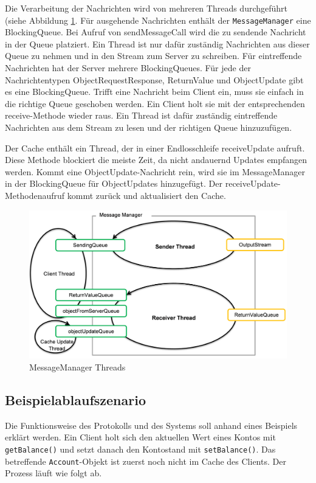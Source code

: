 Die Verarbeitung der Nachrichten wird von mehreren Threads durch\-ge\-führt (siehe Abbildung \ref{fig:msgmng}.
Für ausgehende Nachrichten enthält der \-\texttt{Mes\-sage\-Manager} eine BlockingQueue. Bei Aufruf von sendMessageCall wird die zu sendende Nachricht in der Queue platziert. Ein Thread ist nur dafür zu\-ständig Nachrichten aus dieser Queue zu nehmen und in den Stream zum Server zu schreiben.
Für eintreffende Nachrichten hat der Server mehrere BlockingQueues. Für jede der Nachrichtentypen ObjectRequestResponse, ReturnValue und ObjectUpdate gibt es eine BlockingQueue. Trifft eine Nachricht beim Client ein, muss sie einfach in die richtige Queue geschoben werden. Ein Client holt sie mit der entsprechenden receive-Methode wieder raus. Ein Thread ist dafür zuständig eintreffende Nachrichten aus dem Stream zu lesen und der richtigen Queue hinzuzufügen. 

Der Cache enthält ein Thread, der in einer Endlosschleife receiveUpdate aufruft. Diese Methode blockiert die meiste Zeit, da nicht andauernd Updates empfangen werden. Kommt eine ObjectUpdate-Nachricht rein, wird sie im MessageManager in der BlockingQueue für ObjectUpdates hinzugefügt. Der receiveUpdate-Methodenaufruf kommt zurück und aktualisiert den Cache.

\begin{figure}[ht]
  \centering
  \includegraphics[scale=0.4]{images_objectcaching/messageManager}  
  \caption{MessageManager Threads}
  \label{fig:msgmng}
\end{figure}

\subsection{Beispielablaufszenario}
\label{sec:beisp}

Die Funktionsweise des Protokolls und des Systems soll anhand eines Beispiels erklärt werden. Ein Client holt sich den aktuellen Wert eines Kontos mit \texttt{getBalance()} und setzt danach den Kontostand mit \texttt{setBalance()}. Das betreffende \texttt{Account}-Objekt ist zuerst noch nicht im Cache des Clients. Der Prozess läuft wie folgt ab.

